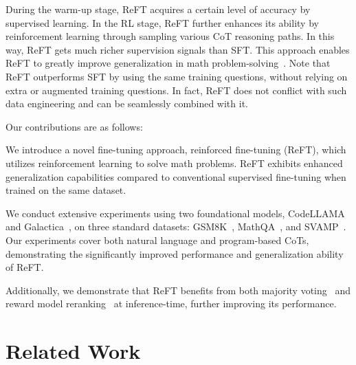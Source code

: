 During the warm-up stage, ReFT acquires a certain level of accuracy by supervised learning. In the RL stage, ReFT further enhances its ability by reinforcement learning through sampling various CoT reasoning paths.
In this way, ReFT gets much richer supervision signals than SFT.
This approach enables ReFT to greatly improve generalization in math problem-solving~\cite{gao2018reinforcement,brown2020better}. %
Note that ReFT outperforms SFT by using the same training questions,
without relying on extra or augmented training questions.
In fact, ReFT does not conflict with such data engineering and can be seamlessly combined with it.

Our contributions are as follows:
\squishlist

\item We introduce a novel fine-tuning approach, reinforced fine-tuning (ReFT), which utilizes reinforcement learning to solve math problems. ReFT exhibits enhanced generalization capabilities compared to conventional supervised fine-tuning when trained on the same dataset.

\item We conduct extensive experiments using two foundational models, CodeLLAMA~\cite{roziere2023code} and Galactica~\cite{taylor2022galactica}, on three standard datasets: GSM8K~\cite{cobbe2021training}, MathQA~\cite{amini2019mathqa}, and SVAMP~\cite{patel2021nlp}. Our experiments cover both natural language and program-based CoTs, demonstrating the significantly improved performance and generalization ability of ReFT.

\item Additionally, we demonstrate that ReFT benefits from both majority voting~\cite{wang2022self} and reward model reranking~\cite{uesato2022solving} at inference-time, further improving its performance.
\squishend

\section{Related Work}


